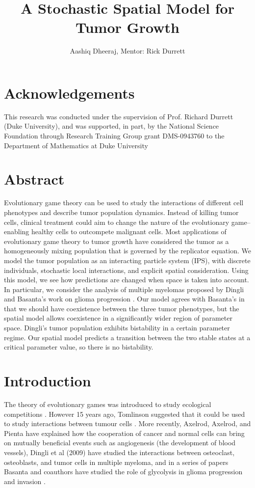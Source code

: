 \documentclass[12pt]{report}
\title{A Stochastic Spatial Model for Tumor Growth}
\author{Aashiq Dheeraj, Mentor: Rick Durrett}
\begin{document}
\maketitle

\chapter*{Acknowledgements}
This research was conducted under the supervision of Prof. Richard Durrett (Duke University), and was supported, in part, by the National Science Foundation through Research Training Group grant DMS-0943760 to the Department of Mathematics at
Duke University
\newpage

\chapter*{Abstract}
Evolutionary game theory can be used to study the interactions of different cell phenotypes and describe tumor population dynamics. Instead of killing tumor cells, clinical treatment could aim to change the nature of the evolutionary game-- enabling healthy cells to outcompete malignant cells. Most applications of  evolutionary game theory to tumor growth have considered the tumor as a homogeneously mixing population that is governed by the replicator equation. We model the tumor population as an interacting particle system (IPS), with discrete individuals, stochastic local interactions, and explicit spatial consideration. Using this model, we see how predictions are changed when space is taken into account. In particular, we consider the analysis of multiple myelomas proposed by Dingli \cite{Dingli2009} and Basanta's work on glioma progression \cite{Basanta2008}. Our model agrees with Basanta's in that we should have coexistence between the three tumor phenotypes, but the spatial model allows coexistence in a significantly wider region of parameter space. Dingli's tumor population exhibits bistability in a certain parameter regime. Our spatial model predicts a transition between the two stable states at a critical parameter value, so there is no bistability. 

\chapter*{Introduction}
	The theory of evolutionary games was introduced to study ecological competitions \cite{Smith1986}. However 15 years ago, Tomlinson suggested that it could be used to study interactions between tumour cells \cite{Tomlinson1997,TomBod}. More recently, Axelrod, Axelrod, and Pienta  \cite{Axelrod2006} have explained how the cooperation of cancer and normal cells can bring on mutually beneficial events such as angiogenesis (the development of blood vessels), Dingli et al (2009) have studied the interactions between osteoclast, osteoblasts, and tumor cells in multiple myeloma, and in a series of papers Basanta and coauthors have studied the role of glycolysis in glioma progression and invasion \cite{Basanta2008,Basanta2011}. \\
	
\end{document}
